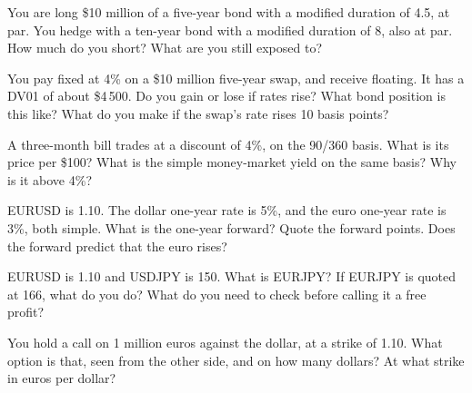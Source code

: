 \begin{question}\label{iq:iv2:rates-and-fx:6}
You are long \$10 million of a five-year bond with a modified duration of 4.5, at par. You hedge with a ten-year bond with a modified duration of 8, also at par. How much do you short? What are you still exposed to?
\end{question}

\begin{question}\label{iq:iv2:rates-and-fx:7}
You pay fixed at 4\% on a \$10 million five-year swap, and receive floating. It has a DV01 of about \$4\,500. Do you gain or lose if rates rise? What bond position is this like? What do you make if the swap's rate rises 10 basis points?
\end{question}

\begin{question}\label{iq:iv2:rates-and-fx:8}
A three-month bill trades at a discount of 4\%, on the 90/360 basis. What is its price per \$100? What is the simple money-market yield on the same basis? Why is it above 4\%?
\end{question}

\begin{question}\label{iq:iv2:rates-and-fx:9}
EURUSD is 1.10. The dollar one-year rate is 5\%, and the euro one-year rate is 3\%, both simple. What is the one-year forward? Quote the forward points. Does the forward predict that the euro rises?
\end{question}

\begin{question}\label{iq:iv2:rates-and-fx:10}
EURUSD is 1.10 and USDJPY is 150. What is EURJPY? If EURJPY is quoted at 166, what do you do? What do you need to check before calling it a free profit?
\end{question}

\begin{question}\label{iq:iv2:rates-and-fx:11}
You hold a call on 1 million euros against the dollar, at a strike of 1.10. What option is that, seen from the other side, and on how many dollars? At what strike in euros per dollar?
\end{question}

